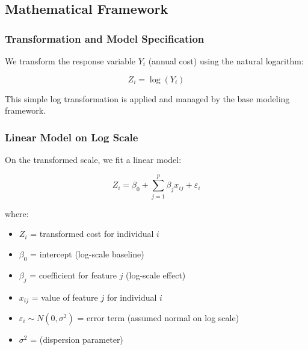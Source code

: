     
    
    

\subsection{Mathematical Framework}

\subsubsection{Transformation and Model Specification}

We transform the response variable $Y_i$ (annual cost) using the natural logarithm:

\begin{equation}
Z_i = \log(Y_i)
\end{equation}

This simple log transformation is applied and managed by the base modeling framework.

\subsubsection{Linear Model on Log Scale}

On the transformed scale, we fit a linear model:

\begin{equation}
Z_i = \beta_0 + \sum_{j=1}^{p} \beta_j x_{ij} + \varepsilon_i
\end{equation}

where:
\begin{itemize}
    \item $Z_i$ = transformed cost for individual $i$
    \item $\beta_0$ = intercept (log-scale baseline)
    \item $\beta_j$ = coefficient for feature $j$ (log-scale effect)
    \item $x_{ij}$ = value of feature $j$ for individual $i$
    \item $\varepsilon_i \sim N(0, \sigma^2)$ = error term (assumed normal on log scale)
    \item $\sigma^2$ = \ModelSixDispersion{} (dispersion parameter)
\end{itemize}


